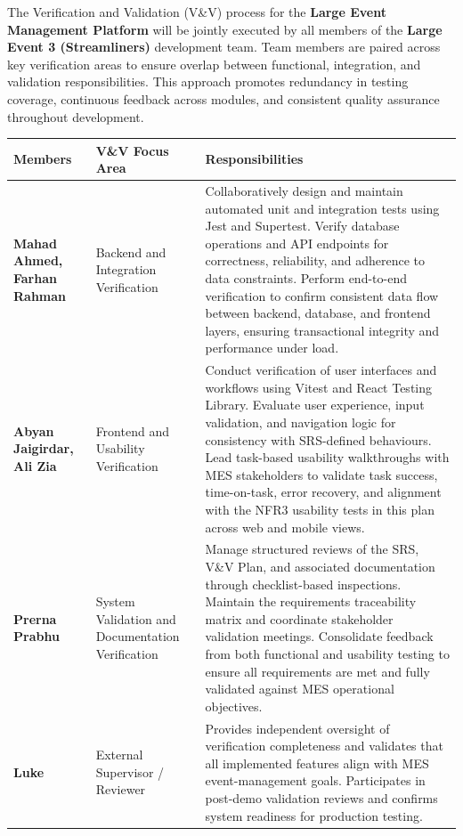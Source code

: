 \documentclass[12pt, titlepage]{article}
\begin{document}
The Verification and Validation (V\&V) process for the \textbf{Large Event Management Platform} will be jointly executed by all members of the \textbf{Large Event 3 (Streamliners)} development team. Team members are paired across key verification areas to ensure overlap between functional, integration, and validation responsibilities. This approach promotes redundancy in testing coverage, continuous feedback across modules, and consistent quality assurance throughout development.

\begin{center}
\begin{tabular}{|p{4cm}|p{4cm}|p{7cm}|}
\hline
\textbf{Members} & \textbf{V\&V Focus Area} & \textbf{Responsibilities} \\ \hline
\textbf{Mahad Ahmed, Farhan Rahman} & Backend and Integration Verification & Collaboratively design and maintain automated unit and integration tests using Jest and Supertest. Verify database operations and API endpoints for correctness, reliability, and adherence to data constraints. Perform end-to-end verification to confirm consistent data flow between backend, database, and frontend layers, ensuring transactional integrity and performance under load. \\ \hline
\textbf{Abyan Jaigirdar, Ali Zia} & Frontend and Usability Verification & Conduct verification of user interfaces and workflows using Vitest and React Testing Library. Evaluate user experience, input validation, and navigation logic for consistency with SRS-defined behaviours. Lead task-based usability walkthroughs with MES stakeholders to validate task success, time-on-task, error recovery, and alignment with the NFR3 usability tests in this plan across web and mobile views. \\ \hline
\textbf{Prerna Prabhu} & System Validation and Documentation Verification & Manage structured reviews of the SRS, V\&V Plan, and associated documentation through checklist-based inspections. Maintain the requirements traceability matrix and coordinate stakeholder validation meetings. Consolidate feedback from both functional and usability testing to ensure all requirements are met and fully validated against MES operational objectives. \\ \hline
\textbf{Luke} & External Supervisor / Reviewer & Provides independent oversight of verification completeness and validates that all implemented features align with MES event-management goals. Participates in post-demo validation reviews and confirms system readiness for production testing. \\ \hline
\end{tabular}
\end{center}
\end{document}
